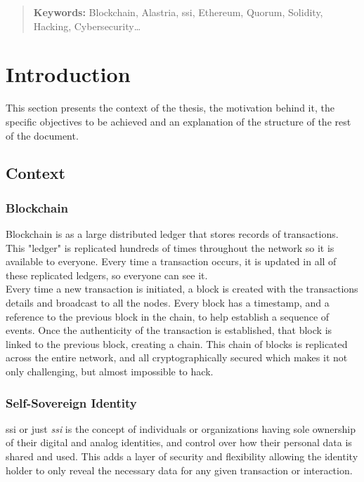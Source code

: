 \documentclass[a4paper, 12pt]{article} %
\begin{document}
\newpage

\begin{abstract}
    \normalsize
    
    \textbf{Keywords:} Blockchain, Alastria, \acrlong{ssi}, Ethereum, Quorum, Solidity, Hacking, Cybersecurity\ldots
\end{abstract}

\newpage
{} %
\UseRawInputEncoding %

\section{Introduction}
    This section presents the context of the thesis, the motivation behind it, the specific objectives to be achieved and an explanation of the structure of the rest of the document.
    
    \subsection{Context}
        \subsubsection{Blockchain}
            Blockchain\cite{blockchain-sum}\cite{blockchainGartner} is as a large distributed ledger that stores records of transactions. This "ledger" is replicated hundreds of times throughout the network so it is available to everyone. Every time a transaction occurs, it is updated in all of these replicated ledgers, so everyone can see it.\\
            
            Every time a new transaction is initiated, a block is created with the transactions details and broadcast to all the nodes. Every block has a timestamp, and a reference to the previous block in the chain, to help establish a sequence of events. Once the authenticity of the transaction is established, that block is linked to the previous block, creating a chain. This chain of blocks is replicated across the entire network, and all cryptographically secured which makes it not only challenging, but almost impossible to hack.
            
        \subsubsection{Self-Sovereign Identity}
            \acrlong{ssi} or just \textit{\acrshort{ssi}}\cite{ssi} is the concept of individuals or organizations having sole ownership of their digital and analog identities, and control over how their personal data is shared and used. This adds a layer of security and flexibility allowing the identity holder to only reveal the necessary data for any given transaction or interaction.\\
            
\end{document}
